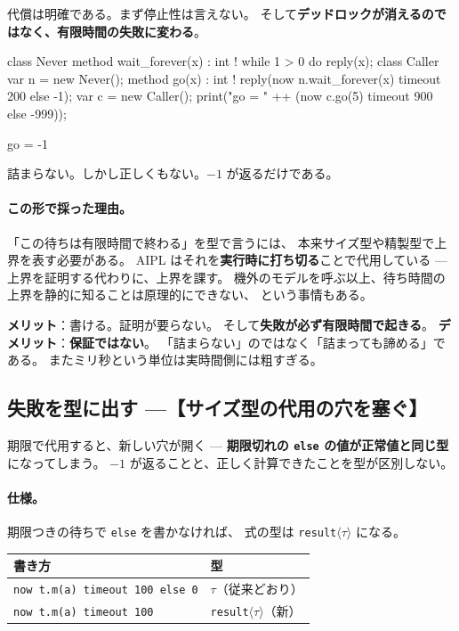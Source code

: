 \documentclass[11pt,a4paper]{ltjsarticle}
\theoremstyle{definition}
\theoremstyle{remark}
\begin{document}
代償は明確である。まず停止性は言えない。
そして\textbf{デッドロックが消えるのではなく、有限時間の失敗に変わる}。

\begin{aipl}
class Never  { method wait_forever(x) : int !{} { while 1 > 0 do { } reply(x); } }
class Caller {
  var n = new Never();
  method go(x) : int !{} { reply(now n.wait_forever(x) timeout 200 else -1); }
}
var c = new Caller();
print("go = " ++ (now c.go(5) timeout 900 else -999));
\end{aipl}
\begin{term}
go = -1
\end{term}

詰まらない。しかし正しくもない。$-1$ が返るだけである。

\paragraph{この形で採った理由。}
「この待ちは有限時間で終わる」を型で言うには、
本来サイズ型や精製型で上界を表す必要がある。
AIPL はそれを\textbf{実行時に打ち切る}ことで代用している ---
上界を証明する代わりに、上界を課す。
機外のモデルを呼ぶ以上、待ち時間の上界を静的に知ることは原理的にできない、
という事情もある。

\textbf{メリット}：書ける。証明が要らない。
そして\textbf{失敗が必ず有限時間で起きる}。
\textbf{デメリット}：\textbf{保証ではない}。
「詰まらない」のではなく「詰まっても諦める」である。
またミリ秒という単位は実時間側には粗すぎる。

\subsection{失敗を型に出す ---【サイズ型の代用の穴を塞ぐ】}

\label{sec:result}

期限で代用すると、新しい穴が開く ---
\textbf{期限切れの \texttt{else} の値が正常値と同じ型}になってしまう。
$-1$ が返ることと、正しく計算できたことを型が区別しない。

\paragraph{仕様。}
期限つきの待ちで \texttt{else} を書かなければ、
式の型は \texttt{result}$\langle\tau\rangle$ になる。

\begin{center}
\begin{tabular}{ll}
\toprule
書き方 & 型 \\
\midrule
\texttt{now t.m(a) timeout 100 else 0} & $\tau$（従来どおり） \\
\texttt{now t.m(a) timeout 100}        & \texttt{result}$\langle\tau\rangle$（新） \\
\bottomrule
\end{tabular}
\end{center}
\end{document}
